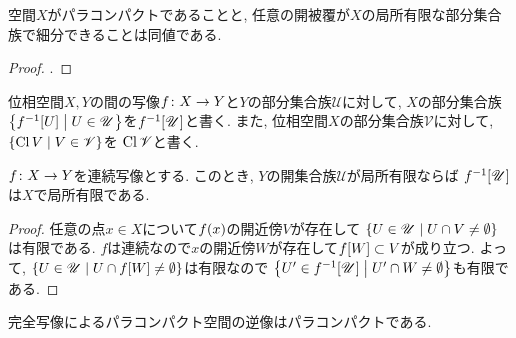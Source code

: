 \documentclass[uplatex, dvipdfmx, a4paper, 12pt, class=jsbook, crop=false]{standalone}
\begin{document}
\begin{proposition}
	 空間$ X $がパラコンパクトであることと,
	任意の開被覆が$ X $の局所有限な部分集合族で細分できることは同値である.
\end{proposition}

\begin{proof}
	\WIP.
\end{proof}

\begin{definition}
	位相空間$ X, Y $の間の写像$ f\colon X\to Y $と$ Y $の部分集合族$ \mathscr{U} $に対して,
	$ X $の部分集合族$ \setcomp{\mapinvset{f}{U}}{U \in \mathscr{U}} $を$ \mapinvset{f}{\mathscr{U}} $と書く.
	また, 位相空間$ X $の部分集合族$ \mathscr{V} $に対して, $ \setcomp{\topcl V}{V \in \mathscr{V}} $を
	$ \mathop{\mathrm{Cl}}\nolimits \mathscr{V} $と書く.
\end{definition}

\begin{proposition}
	\label{p00001}
	$ f\colon X\to Y $を連続写像とする. このとき, $ Y $の開集合族$ \mathscr{U} $が局所有限ならば
	$ \mapinvset{f}{\mathscr{U}} $は$ X $で局所有限である.
\end{proposition}

\begin{proof}
	任意の点$ x \in X $について$ \mappt{f}{x} $の開近傍$ V $が存在して
	$ \setcomp{U \in \mathscr{U}}{U \cap V \neq \emptyset} $は有限である.
	$ f $は連続なので$ x $の開近傍$ W $が存在して$ \mapset{f}{W} \subset V $が成り立つ.
	よって, $ \setcomp{U \in \mathscr{U}}{U \cap \mapset{f}{W} \neq \emptyset} $は有限なので
	$ \setcomp{U' \in \mapinvset{f}{\mathscr{U}}}{U' \cap W \neq \emptyset} $も有限である.
\end{proof}

\begin{proposition}
	\label{p00002}
	完全写像によるパラコンパクト空間の逆像はパラコンパクトである.
\end{proposition}
\end{document}
